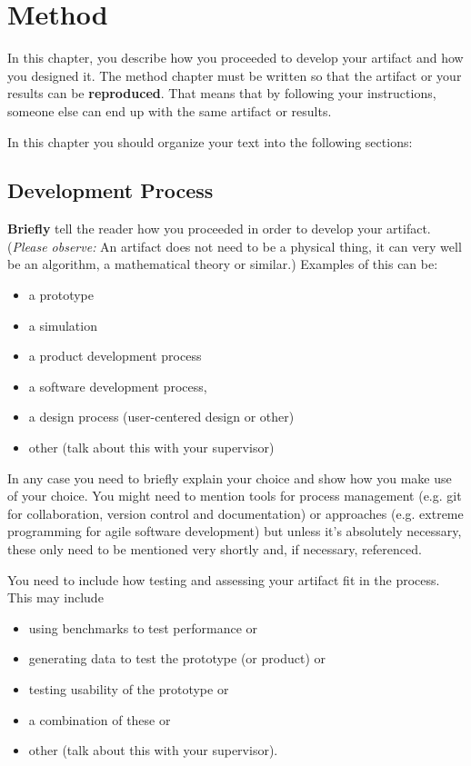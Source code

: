 \chapter{Method}
\label{chap:method}
\begin{instructions}
\begin{notplan}
In this chapter, you describe how you proceeded to develop your artifact and how you designed it. The method chapter must be written so that the artifact or your results can be \textbf{reproduced}. That means that by following your instructions, someone else can end up with the same artifact or results.
\end{notplan}

In this chapter you should organize your text into the following sections:
\end{instructions}

\section{Development Process}
\label{sec:devprocess}
\begin{instructions}
\textbf{Briefly} tell the reader how you proceeded in order to develop your artifact. (\emph{Please observe:} An artifact does not need to be a physical thing, it can very well be an algorithm, a mathematical theory or similar.) Examples of this can be:
\begin{itemize}
    \item a prototype
    \item a simulation
    \item a product development process
    \item a software development process,
    \item a design process (user-centered design or other)
    \item other (talk about this with your supervisor)
\end{itemize}
In any case you need to briefly explain your choice and show how you make use of your choice. You might need to mention tools for process management (e.g. git for collaboration, version control and documentation) or approaches (e.g. extreme programming for agile software development) but unless it's absolutely necessary, these only need to be mentioned very shortly and, if necessary, referenced.

You need to include how testing and assessing your artifact fit in the process. This may include
\begin{itemize}
    \item using benchmarks to test performance or
    \item generating data to test the prototype (or product) or
    \item testing usability of the prototype or
    \item a combination of these or
    \item other (talk about this with your supervisor).
\end{itemize}
\end{instructions}

